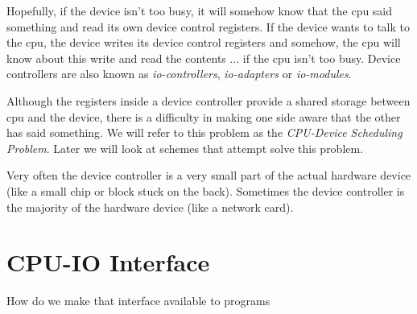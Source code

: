 \begin{figure}[h]
\end{figure} 

Hopefully, if the device isn’t too busy, it will somehow know that the cpu said 
something and read its own device control registers. 
If the device wants to talk to the cpu, the device writes its device control registers 
and somehow, the cpu will know about this write and read the contents ... if the cpu isn’t too busy. 
Device controllers are also known as \textit{io-controllers}, 
\textit{io-adapters} or \textit{io-modules}. 

Although the registers inside a device controller provide a shared storage between cpu 
and the device, there is a difficulty in making one side aware that the other has said 
something. We will refer to this problem as the \textit{CPU-Device Scheduling Problem}. 
Later we will look at schemes that attempt solve this problem.

Very often the device controller is a very small part of the actual hardware device 
(like a small chip or block stuck on the back). 
Sometimes the device controller is the majority of the hardware device 
(like a network card).


\section{CPU-IO Interface}

How do we make that interface available to programs

